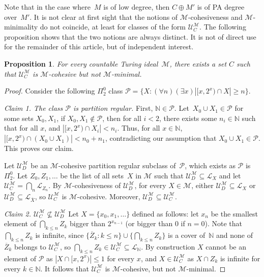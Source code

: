 \documentclass{article}
\def\NN{\mathbb{N}}
\def\U{\mathcal{U}}
\def\P{\mathcal{P}}
\def\M{\mathcal{M}}
\renewcommand{\L}[0]{\mathcal{L}}
\numberwithin{theorem}{section}
\newtheorem{proposition}[theorem]{Proposition}
\theoremstyle{definition}
\begin{document}
Note that in the case where~$M$ is of low degree, then $C \oplus M'$ is of PA degree over~$M'$.
It is not clear at first sight that the notions of $\M$-cohesiveness and $\M$-minimality do not coincide, at least for classes of the form $\U_C^\M$. The following proposition shows that the two notions are always distinct. It is not of direct use for the remainder of this article, but of independent interest.

\begin{proposition}
For every countable Turing ideal~$\M$, there exists a set $C$ such that $\U_C^\M$ is $\M$-cohesive but not $\M$-minimal.
\end{proposition}

\begin{proof}
Consider the following $\Pi_2^0$ class $\P = \{X : (\forall n)(\exists x) |[x,2^x) \cap X| \geq n\}$.
\smallskip

\emph{Claim 1. The class $\P$ is partition regular.} First, $\NN \in \P$. Let~$X_0 \cup X_1 \in \P$ for some sets $X_0,X_1$, if $X_0,X_1 \notin \P$, then for all $i < 2$, there exists some $n_i \in \NN$ such that for all $x$, and  $|[x,2^x) \cap X_i| < n_i$. Thus, for all $x \in \NN$, $|[x,2^x) \cap (X_0 \cup X_1)| < n_0 + n_1$, contradicting our assumption that $X_0 \cup X_1 \in \P$. This proves our claim.
\smallskip

Let $\U_D^\M$ be an $\M$-cohesive partition regular subclass of~$\P$, which exists as $\P$ is $\Pi^0_2$.
Let $Z_0, Z_1, \dots$ be the list of all sets~$X$ in $\M$ such that $\U_D^\M \subseteq \L_X$ and
let $\U_C^\M = \bigcap_n \L_{Z_n}$.
By $\M$-cohesiveness of $\U_D^\M$, for every $X \in \M$, either $\U_D^\M \subseteq \L_X$ or $\U_D^\M \subseteq \L_{\overline{X}}$, so $\U_C^\M$ is $\M$-cohesive. Moreover, $\U_D^\M \subseteq \U_C^\M$.
\smallskip

\emph{Claim 2. $\U_C^\M \not \subseteq \U_D^\M$}
Let $X = \{x_0, x_1, \dots \}$ defined as follows: let $x_n$ be the smallest element of $\bigcap_{k \leq n} Z_k$ bigger than $2^{x_{n-1}}$ (or bigger than $0$ if $n = 0$). Note that $\bigcap_{k \leq n} Z_k$ is infinite, since $\{ \overline{Z}_k : k \leq n \} \cup \{\bigcap_{k \leq n} Z_k\}$ is a cover of~$\NN$ and none of $\overline{Z}_k$ belongs to $\U_C^\M$, so $\bigcap_{k \leq n} Z_k \in \U_C^\M \subseteq \L_\NN$. By construction $X$ cannot be an element of $\P$ as $|X \cap [x,2^x)| \leq 1$ for every $x$, and $X \in \U_C^\M$ as $X \cap Z_k$ is infinite for every $k \in \NN$.
It follows that $\U_C^\M$ is $\M$-cohesive, but not $\M$-minimal.



\end{proof}
\end{document}
